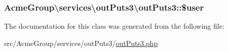 \hypertarget{class_acme_group_1_1services_1_1out_puts3_1_1out_puts3_a3b858cecd9006c3e2a9bff69cce4bf7f}{
\subsubsection[{\$user}]{\setlength{\rightskip}{0pt plus 5cm}Acme\+Group\textbackslash{}services\textbackslash{}out\+Puts3\textbackslash{}out\+Puts3\+::\$user\hspace{0.3cm}{\ttfamily [protected]}}}\label{class_acme_group_1_1services_1_1out_puts3_1_1out_puts3_a3b858cecd9006c3e2a9bff69cce4bf7f}


The documentation for this class was generated from the following file\+:\begin{DoxyCompactItemize}
\item 
src/\+Acme\+Group/services/out\+Puts3/\hyperlink{services_2out_puts3_2out_puts3_8php}{out\+Puts3.\+php}\end{DoxyCompactItemize}
